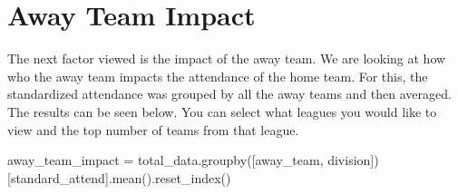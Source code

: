 \documentclass[
  letterpaper,
  DIV=11,
  numbers=noendperiod]{scrartcl}
\newenvironment{Shaded}{\begin{snugshade}}{\end{snugshade}}
\newcommand{\NormalTok}[1]{\textcolor[rgb]{0.00,0.23,0.31}{#1}}
\newcommand{\OperatorTok}[1]{\textcolor[rgb]{0.37,0.37,0.37}{#1}}
\newcommand{\StringTok}[1]{\textcolor[rgb]{0.13,0.47,0.30}{#1}}
\begin{document}
\hypertarget{away-team-impact}{%
\section{Away Team Impact}\label{away-team-impact}}

The next factor viewed is the impact of the away team. We are looking at
how who the away team impacts the attendance of the home team. For this,
the standardized attendance was grouped by all the away teams and then
averaged. The results can be seen below. You can select what leagues you
would like to view and the top number of teams from that league.

\begin{Shaded}
\begin{Highlighting}[]
\NormalTok{away\_team\_impact }\OperatorTok{=}\NormalTok{ total\_data.groupby([}\StringTok{\textquotesingle{}away\_team\textquotesingle{}}\NormalTok{, }\StringTok{\textquotesingle{}division\textquotesingle{}}\NormalTok{])[}\StringTok{\textquotesingle{}standard\_attend\textquotesingle{}}\NormalTok{].mean().reset\_index()}



\end{Highlighting}
\end{Shaded}
\end{document}
